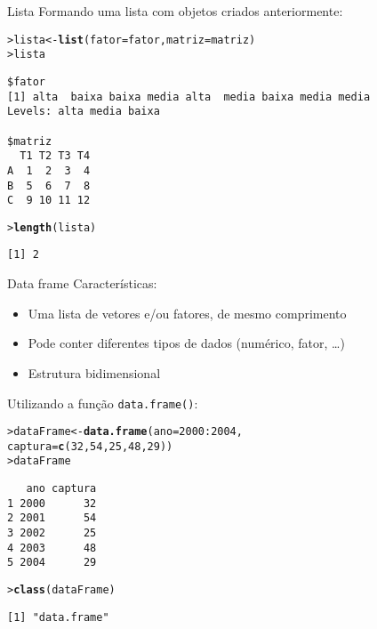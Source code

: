 \documentclass[10pt,handout]{beamer}\usepackage{graphicx, color}
\makeatletter
\newcommand{\hlfunctioncall}[1]{\textcolor[rgb]{0,0,0.545098039215686}{\textbf{#1}}}%
\newenvironment{kframe}{%
 \def\at@end@of@kframe{}%
 \ifinner\ifhmode%
  \def\at@end@of@kframe{\end{minipage}}%
  \begin{minipage}{\columnwidth}%
 \fi\fi%
 \def\FrameCommand##1{\hskip\@totalleftmargin \hskip-\fboxsep
 \colorbox{shadecolor}{##1}\hskip-\fboxsep
     \hskip-\linewidth \hskip-\@totalleftmargin \hskip\columnwidth}%
 \MakeFramed {\advance\hsize-\width
   \@totalleftmargin\z@ \linewidth\hsize
   \@setminipage}}%
 {\par\unskip\endMakeFramed%
 \at@end@of@kframe}
\newenvironment{knitrout}{}{} %
\makeatother
\begin{document}
\begin{frame}[fragile=singleslide]{Lista}
Formando uma lista com objetos criados anteriormente:
\begin{knitrout}\small
{}\color{fgcolor}\begin{kframe}
\begin{alltt}
> lista <- \hlfunctioncall{list}(fator = fator, matriz = matriz)
> lista
\end{alltt}
\begin{verbatim}
$fator
[1] alta  baixa baixa media alta  media baixa media media
Levels: alta media baixa

$matriz
  T1 T2 T3 T4
A  1  2  3  4
B  5  6  7  8
C  9 10 11 12

\end{verbatim}
\begin{alltt}
> \hlfunctioncall{length}(lista)
\end{alltt}
\begin{verbatim}
[1] 2
\end{verbatim}
\end{kframe}
\end{knitrout}

\end{frame}

\begin{frame}[fragile=singleslide]{Data frame}
Características:
\begin{itemize}
\item Uma lista de vetores e/ou fatores, de mesmo comprimento
\item Pode conter diferentes tipos de dados (numérico, fator, \ldots)
\item Estrutura bidimensional
\end{itemize}
Utilizando a função \texttt{data.frame()}:
\begin{knitrout}\small
{}\color{fgcolor}\begin{kframe}
\begin{alltt}
> dataFrame <- \hlfunctioncall{data.frame}(ano = 2000:2004,
                          captura = \hlfunctioncall{c}(32, 54, 25, 48, 29))
> dataFrame
\end{alltt}
\begin{verbatim}
   ano captura
1 2000      32
2 2001      54
3 2002      25
4 2003      48
5 2004      29
\end{verbatim}
\begin{alltt}
> \hlfunctioncall{class}(dataFrame)
\end{alltt}
\begin{verbatim}
[1] "data.frame"
\end{verbatim}
\end{kframe}
\end{knitrout}

\end{frame}
\end{document}
